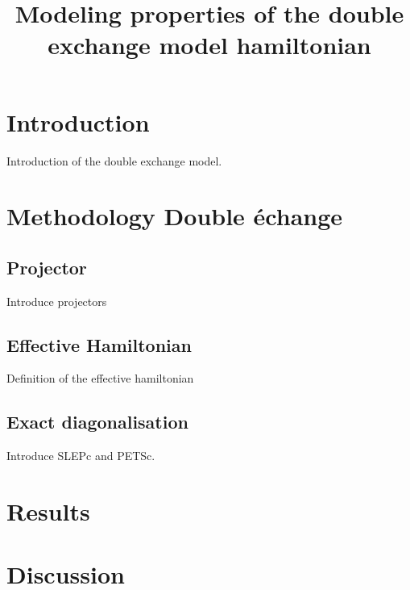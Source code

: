 \documentclass[ openright,titlepage,numbers=noenddot,headinclude,twoside,%
                footinclude=true,cleardoublepage=empty,abstractoff,%
                BCOR=5mm,paper=a4,fontsize=11pt,%
                ngerman,american,%
]{scrreprt}
\title{Modeling properties of the double exchange model hamiltonian}
\begin{document}
\maketitle
\thispagestyle{fancy}
\section{Introduction}

Introduction of the double exchange model.

\section{Methodology Double échange}

\subsection{Projector}

Introduce projectors

\subsection{Effective Hamiltonian}

Definition of the effective hamiltonian

\subsection{Exact diagonalisation}

Introduce SLEPc and PETSc.

\section{Results}
\section{Discussion}
\end{document}
